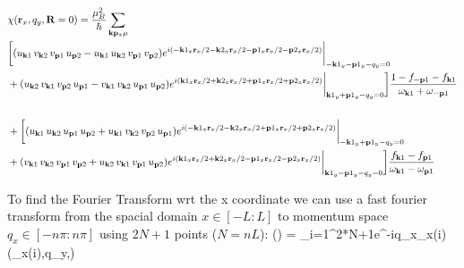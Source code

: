 \documentclass[aps,prl,twocolumn,showpacs,amsmath,amssymb]{revtex4-1}
\begin{document}
\begin{widetext}
\begin{align*}
&\chi({\bf r}_x,q_y,{\bf R}=0) = \frac{\mu_B^2}{\hbar}\sum\limits_{{\bf k}{\bf p}_x\mu}   \\
&\bigg[(u_{{\bf k}1} \, v_{{\bf k}2} \, v_{{\bf p}1} \, u_{{\bf p}2}-u_{{\bf k}1} \, u_{{\bf k}2} \, v_{{\bf p}1} \, v_{{\bf p}2})e^{i(-{\bf k}1_x{\bf r}_x/2-{\bf k}2_x{\bf r}_x/2-{\bf p}1_x{\bf r}_x/2-{\bf p}2_x{\bf r}_x/2)}\bigg|_{-{\bf k}1_y-{\bf p}1_y-q_y=0}\\
& + (u_{{\bf k}2} \, v_{{\bf k}1} \, v_{{\bf p}2} \, u_{{\bf p}1}- v_{{\bf k}1} \, v_{{\bf k}2} \,u_{{\bf p}1} \, u_{{\bf p}2} )e^{i({\bf k}1_x{\bf r}_x/2+{\bf k}2_x{\bf r}_x/2+{\bf p}1_x{\bf r}_x/2+{\bf p}2_x{\bf r}_x/2)}\bigg|_{{\bf k}1_y+{\bf p}1_y-q_y=0}\bigg] \frac{1-f_{-{\bf p}1}-f_{{\bf k}1}}{\omega_{{\bf k}1} +\omega_{-{\bf p}1}} \\
\\
&+\bigg[(u_{{\bf k}1} \, u_{{\bf k}2} \, u_{{\bf p}1} \, u_{{\bf p}2}+ u_{{\bf k}1} \, v_{{\bf k}2} \, v_{{\bf p}2} \, u_{{\bf p}1})e^{i(-{\bf k}1_x{\bf r}_x/2-{\bf k}2_x{\bf r}_x/2+{\bf p}1_x{\bf r}_x/2+{\bf p}2_x{\bf r}_x/2)}\bigg|_{-{\bf k}1_y+{\bf p}1_y-q_y=0} \\
& + (v_{{\bf k}1} \, v_{{\bf k}2} \,v_{{\bf p}1} \, v_{{\bf p}2} +u_{{\bf k}2} \, v_{{\bf k}1} \,v_{{\bf p}1} \, u_{{\bf p}2})e^{i({\bf k}1_x{\bf r}_x/2+{\bf k}2_x{\bf r}_x/2-{\bf p}1_x{\bf r}_x/2-{\bf p}2_x{\bf r}_x/2)}\bigg|_{{\bf k}1_y-{\bf p}1_y-q_y=0} \bigg]\frac{f_{{\bf k}1} - f_{{\bf p}1}}{\omega_{{\bf k}1} - \omega_{{\bf p}1}}
\end{align*}
\end{widetext}

To find the Fourier Transform wrt the x coordinate we can use a fast fourier transform from the spacial domain $x\in[-L:L]$ to momentum space $q_x\in[-n\pi:n\pi]$ using $2N+1$ points ($N=nL$):
\be
\chi(\vq) = \sum\limits_{i=1}^{2*N+1}e^{-iq_x\vr_x(i)}\chi(\vr_x(i),q_y,)
\ee
\end{document}
